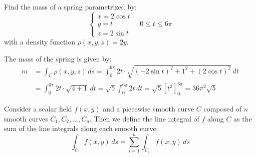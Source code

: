 \documentclass[11pt]{report}
\begin{document}
\begin{example}
    Find the mass of a spring parametrized by:
    $$
    \begin{cases}
        x = 2 \cos t \\
        y = t \\
        z = 2 \sin t
    \end{cases} \quad 0 \leq t \leq 6\pi
    $$
    with a density function $\rho(x,y,z) = 2y$.

    The mass of the spring is given by:
    \begin{align*}
        m &= \int_C \rho(x,y,z) \, ds = \int_0^{6\pi} 2t \cdot \sqrt{(-2\sin t)^2 + 1^2 + (2\cos t)^2} \, dt \\
        &= \int_0^{6\pi} 2t \cdot \sqrt{4 + 1} \, dt = \sqrt{5} \int_0^{6\pi} 2t \, dt = \sqrt{5} \left[ t^2 \right]_0^{6\pi} = 36\pi^2 \sqrt{5}
    \end{align*}    
\end{example}

\begin{definition}
    Consider a scalar field $f(x,y)$ and a piecewise smooth curve $C$ composed of $n$ smooth curves $C_1, C_2, \ldots, C_n$. Then we define the line integral of $f$ along $C$ as the sum of the line integrals along each smooth curve:
    \begin{equation}
        \int_C f(x,y) \, ds = \sum_{i=1}^n \int_{C_i} f(x,y) \, ds
    \end{equation}
\end{definition}
\end{document}
